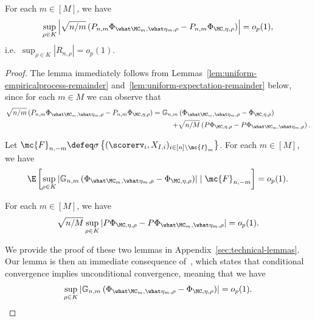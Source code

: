 \begin{lemma}
\label{lem:uniform-bound-remainder}
For each $m \in [M]$, we have
\begin{align*}
\sup_{\rho \in K} \left|  \sqrt{n/m} \left( P_{n,m} \Phi_{\what \MC_m, \what \eta_m, \rho} - P_{n,m} \Phi_{\MC,  \eta, \rho} \right) \right| = o_p(1),
\end{align*}
i.e.\ $\sup_{\rho \in K} |R_{n,\rho}| = o_p(1)$.
\end{lemma}
\begin{proof}
The lemma immediately follows from Lemmas~\ref{lem:uniform-empiricalprocess-remainder} and~\ref{lem:uniform-expectation-remainder} below, since for each $m \in M$ we can observe that
\begin{align*}
\begin{split}
\sqrt{n/m} \left( P_{n,m} \Phi_{\what \MC_m, \what \eta_m, \rho} - P_{n,m} \Phi_{\MC,  \eta, \rho} \right) 
= \mathbb{G}_{n,m}&\left( \Phi_{\what \MC_m, \what \eta_m, \rho} - \Phi_{\MC,  \eta, \rho} \right) \\ +& \sqrt{n/M}\left(P\Phi_{\MC,  \eta, \rho} - P \Phi_{\what \MC_m, \what \eta_m, \rho} \right).
\end{split} 
\end{align*}

\begin{lemma}
\label{lem:uniform-empiricalprocess-remainder}
Let $\mc{F}_{n,-m} \defeq \sigma \left\{ (\scorerv_i , X_{I,i})_{i \in [n] \setminus \mc{I}_m} \right\} $. 
For each $m \in [M]$, we have
\begin{align*}
\E\left[ \sup_{\rho \in K} \left|  \mathbb{G}_{n,m}\left( \Phi_{\what \MC_m, \what \eta_m, \rho} - \Phi_{\MC,  \eta, \rho} \right) \right| \mid \mc{F}_{n,-m} \right] = o_p(1).
\end{align*}
\end{lemma}

\begin{lemma}
\label{lem:uniform-expectation-remainder}
For each $m \in [M]$, we have
\begin{align*}
\sqrt{n/M}\sup_{\rho \in K} \left|P\Phi_{\MC,  \eta, \rho} - P \Phi_{\what \MC_m, \what \eta_m, \rho} \right| = o_p(1).
\end{align*}
\end{lemma}
We provide the proof of these two lemmas in Appendix~\ref{sec:technical-lemmas}. 
Our lemma is then an immediate consequence of~\citet[Lemma 6.1]{ChernozhukovChDeDuHaNeRo16}, which states that conditional convergence implies unconditional convergence, meaning that we have
\begin{align*}
 \sup_{\rho \in K} \left|  \mathbb{G}_{n,m}\left( \Phi_{\what \MC_m, \what \eta_m, \rho} - \Phi_{\MC,  \eta, \rho} \right) \right|  = o_p(1).
\end{align*}
\end{proof}

